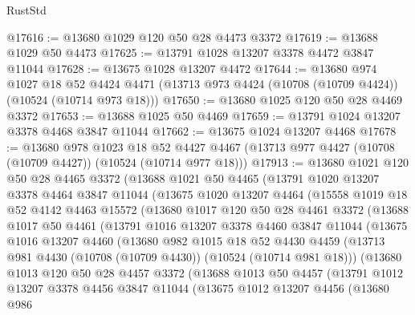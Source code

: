 \begin{lexlean}{RustStd}
\begin{coremodule}
@17616 := @13680 @1029 @120 @50 @28 @4473 @3372
@17619 := @13688 @1029 @50 @4473
@17625 := @13791 @1028 @13207 @3378 @4472 @3847 @11044
@17628 := @13675 @1028 @13207 @4472
@17644 := @13680
    @974
    @1027
    @18
    @52
    @4424
    @4471
    (@13713 @973 @4424 (@10708 (@10709 @4424)) (@10524 (@10714 @973 @18)))
@17650 := @13680 @1025 @120 @50 @28 @4469 @3372
@17653 := @13688 @1025 @50 @4469
@17659 := @13791 @1024 @13207 @3378 @4468 @3847 @11044
@17662 := @13675 @1024 @13207 @4468
@17678 := @13680
    @978
    @1023
    @18
    @52
    @4427
    @4467
    (@13713 @977 @4427 (@10708 (@10709 @4427)) (@10524 (@10714 @977 @18)))
@17913 := @13680
    @1021
    @120
    @50
    @28
    @4465
    @3372
    (@13688
      @1021
      @50
      @4465
      (@13791
        @1020
        @13207
        @3378
        @4464
        @3847
        @11044
        (@13675
          @1020
          @13207
          @4464
          (@15558
            @1019
            @18
            @52
            @4142
            @4463
            @15572
            (@13680
              @1017
              @120
              @50
              @28
              @4461
              @3372
              (@13688
                @1017
                @50
                @4461
                (@13791
                  @1016
                  @13207
                  @3378
                  @4460
                  @3847
                  @11044
                  (@13675
                    @1016
                    @13207
                    @4460
                    (@13680
                      @982
                      @1015
                      @18
                      @52
                      @4430
                      @4459
                      (@13713 @981 @4430 (@10708 (@10709 @4430)) (@10524 (@10714 @981 @18)))
                      (@13680
                        @1013
                        @120
                        @50
                        @28
                        @4457
                        @3372
                        (@13688
                          @1013
                          @50
                          @4457
                          (@13791
                            @1012
                            @13207
                            @3378
                            @4456
                            @3847
                            @11044
                            (@13675
                              @1012
                              @13207
                              @4456
                              (@13680
                                @986

\end{coremodule}
\end{lexlean}
